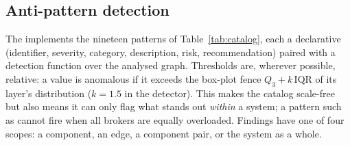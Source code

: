 \subsection{Anti-pattern detection}
\label{sec:analyses:catalog}

The  implements the nineteen patterns of Table~\ref{tab:catalog}, each a declarative  (identifier, severity, category, description, risk, recommendation) paired with a detection function over the analysed graph. Thresholds are, wherever possible, relative: a value is anomalous if it exceeds the box-plot fence $Q_3 + k\,\mathrm{IQR}$ of its layer's distribution ($k = 1.5$ in the detector). This makes the catalog scale-free but also means it can only flag what stands out \emph{within} a system; a pattern such as  cannot fire when all brokers are equally overloaded. Findings have one of four scopes: a component, an edge, a component pair, or the system as a whole.

